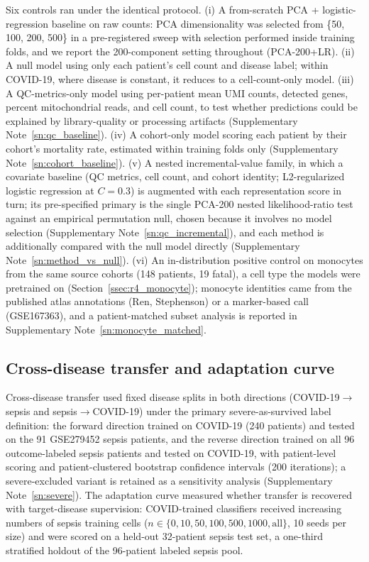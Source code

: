 Six controls ran under the identical protocol. (i) A from-scratch
PCA + logistic-regression baseline on raw counts: PCA dimensionality was
selected from \{50, 100, 200, 500\} in a pre-registered sweep with
selection performed inside training folds, and we report the 200-component
setting throughout (PCA-200+LR). (ii) A null model using only each patient's
cell count and disease label; within COVID-19, where disease is constant, it
reduces to a cell-count-only model. (iii) A QC-metrics-only model using
per-patient mean UMI counts, detected genes, percent mitochondrial reads, and
cell count, to test whether predictions could be explained by library-quality
or processing artifacts (Supplementary Note~\ref{sn:qc_baseline}).
(iv) A cohort-only model scoring each patient by their cohort's mortality
rate, estimated within training folds only
(Supplementary Note~\ref{sn:cohort_baseline}). (v) A nested incremental-value
family, in which a covariate baseline (QC metrics, cell count, and cohort
identity; L2-regularized logistic regression at $C = 0.3$) is augmented with
each representation score in turn; its pre-specified primary is the single
PCA-200 nested likelihood-ratio test against an empirical permutation null,
chosen because it involves no model selection
(Supplementary Note~\ref{sn:qc_incremental}), and each method is additionally
compared with the null model directly
(Supplementary Note~\ref{sn:method_vs_null}). (vi) An
in-distribution positive control on monocytes from the same source cohorts
(148 patients, 19 fatal), a cell type the models were pretrained on
(Section~\ref{ssec:r4_monocyte}); monocyte identities came from the published
atlas annotations (Ren, Stephenson) or a marker-based call (GSE167363), and a
patient-matched subset analysis is reported in
Supplementary Note~\ref{sn:monocyte_matched}.

\subsection{Cross-disease transfer and adaptation curve}
\label{ssec:methods_transfer}

Cross-disease transfer used fixed disease splits in both directions
(COVID-19$\rightarrow$sepsis and sepsis$\rightarrow$COVID-19) under the primary
severe-as-survived label definition: the forward direction trained on COVID-19
(240 patients) and tested on the 91 GSE279452 sepsis patients, and the reverse
direction trained on all 96 outcome-labeled sepsis patients and tested on
COVID-19, with patient-level scoring and patient-clustered bootstrap
confidence intervals (200 iterations); a
severe-excluded variant is retained as a sensitivity analysis
(Supplementary Note~\ref{sn:severe}). The adaptation curve measured whether
transfer is recovered with target-disease supervision: COVID-trained
classifiers received increasing numbers of sepsis training cells
($n \in \{0, 10, 50, 100, 500, 1000, \text{all}\}$, 10 seeds per size) and were
scored on a held-out 32-patient sepsis test set, a one-third stratified
holdout of the 96-patient labeled sepsis pool.

